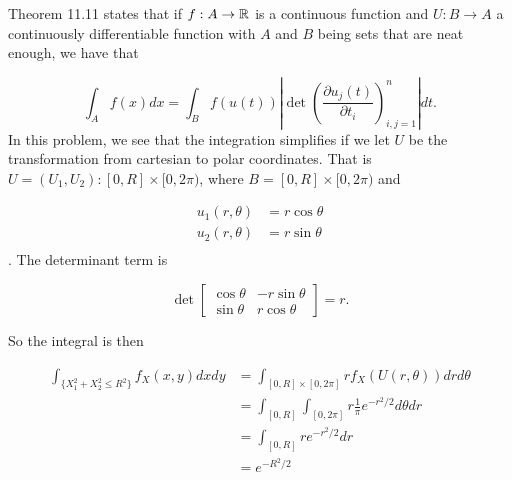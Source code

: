 
Theorem 11.11 states that if $ f: A \to \mathbb{R}$ is a continuous function and $U:B \to A$ a continuously
differentiable function with $ A$ and $ B$ being sets that are neat enough, we have that 

\[
    \int_{A}^{} f(x)dx = \int_{B}^{} f(u(t)) |\det( \frac{\partial u_{j} (t)}{\partial t_{i}
    })_{i,j=1}^{n} |dt
.\] 
In this problem, we see that the integration simplifies if we let $ U$ be the transformation from
cartesian to polar coordinates. That is $ U = (U_1, U_2): [0,R] \times [0,2\pi)$, where $ B = [0,R]
\times [0,2\pi)$ and 

\begin{align*}
    u_1(r,\theta) &= r \cos \theta\\
    u_2(r, \theta)&= r \sin \theta\\ 
\end{align*}.
The determinant term is

\[
    \det \begin{bmatrix}
	\cos \theta & -r \sin \theta \\
	\sin\theta & r \cos \theta
    \end{bmatrix} = r
.\] 

So the integral is then

\begin{align*}
    \int_{ \{ X_1^2 + X_2^2 \leq R^2 \} }^{} f_{X} (x,y) dx dy&= \int_{[0,R] \times [0,2\pi]}^{} r
    f_{X} ( U(r, \theta)) dr d\theta \\
							      &= \int_{[0,R]}^{} \int_{[0,2\pi]}^{}
							      r \frac{1}{\pi} e^{-r^2/2} d\theta
							      dr\\
							      &= \int_{[0,R]}^{} re^{-r^2/2} dr \\
							      &= e^{-R^2/2} 
\end{align*}
